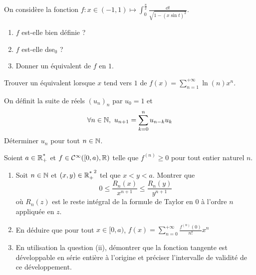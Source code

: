 \begin{exo}
	\label{seriesent1}
	On considère la fonction $f:x\in(-1,1)\mapsto \int_0^{\frac\pi2}\frac{\dd t}{\sqrt{1-(x\sin t)^2}}$.
	\begin{enumerate}
		\item $f$ est-elle bien définie ?
		\item $f$ est-elle dse${}_0$ ?
		\item Donner un équivalent de $f$ en $1$.
	\end{enumerate}
\end{exo}

\begin{exo}
	\label{seriesent2}
	Trouver un équivalent lorsque $x$ tend vers $1$ de $f(x)=\sum_{n=1}^{+\infty}\ln(n)x^n$.
\end{exo}

\begin{exo}
	\label{seriesent3}
	On définit la suite de réels $(u_n)_n$ par $u_0=1$ et \[\forall n\in\N,\ u_{n+1}=\sum_{k=0}^nu_{n-k}u_k\]
	Déterminer $u_n$ pour tout $n\in\operatorname{\mathbb N}$.
\end{exo}

\begin{exo}
	\label{seriesent4}
	Soient $a\in\operatorname{\mathbb R_+^*}$ et $f\in\mathcal C^\infty([0, a),\operatorname{\mathbb R})$ telle que $f^{(n)}\geq 0$ pour tout entier naturel $n$.
	\begin{enumerate}
		\item Soit $n\in\operatorname{\mathbb N}$ et $(x,y)\in{\operatorname{\mathbb R_+^*}}^2$ tel que $x < y < a$. Montrer que \[0\leq \frac{R_n(x)}{x^{n+1}}\leq \frac{R_n(y)}{y^{n+1}}\]
		où $R_n(z)$ est le reste intégral de la formule de Taylor en $0$ à l'ordre $n$ appliquée en $z$.
		\item En déduire que pour tout $x\in[0,a)$, $f(x)=\sum_{n=0}^{+\infty}\frac{f^{(n)}(0)}{n!}x^n$
		\item En utilisation la question (ii), démontrer que la fonction tangente est développable en série entière à l'origine et préciser l'intervalle de validité de ce développement.
	\end{enumerate}
\end{exo}

